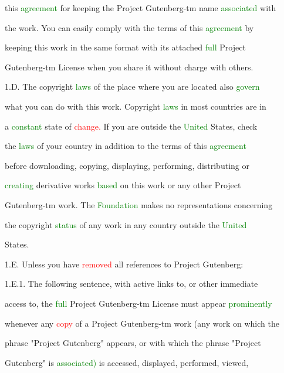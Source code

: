  this \textcolor{green}{agreement} for keeping the Project Gutenberg-tm name \textcolor{green}{associated} with

 the work. You can easily comply with the terms of this \textcolor{green}{agreement} by

 keeping this work in the same format with its attached \textcolor{green}{full} Project

 Gutenberg-tm License when you \textcolor{BurntOrange}{share} it without charge with others.



 1.D. The copyright \textcolor{green}{laws} of the place where you are located also \textcolor{green}{govern}

 what you can do with this work. Copyright \textcolor{green}{laws} in most countries are in

 a \textcolor{green}{constant} state of \textcolor{red}{change.} If you are outside the \textcolor{green}{United} States, check

 the \textcolor{green}{laws} of your country in addition to the terms of this \textcolor{green}{agreement}

 before downloading, copying, displaying, performing, distributing or

 \textcolor{green}{creating} derivative works \textcolor{green}{based} on this work or any other Project

 Gutenberg-tm work. The \textcolor{green}{Foundation} makes no representations concerning

 the copyright \textcolor{green}{status} of any work in any country outside the \textcolor{green}{United}

 States.



 1.E. Unless you have \textcolor{red}{removed} all references to Project Gutenberg:



 1.E.1. The following \textcolor{BurntOrange}{sentence,} with active links to, or other immediate

 access to, the \textcolor{green}{full} Project Gutenberg-tm License must appear \textcolor{green}{prominently}

 whenever any \textcolor{red}{copy} of a Project Gutenberg-tm work (any work on which the

 phrase "Project Gutenberg" appears, or with which the phrase "Project

 Gutenberg" is \textcolor{green}{associated)} is accessed, displayed, performed, viewed,

